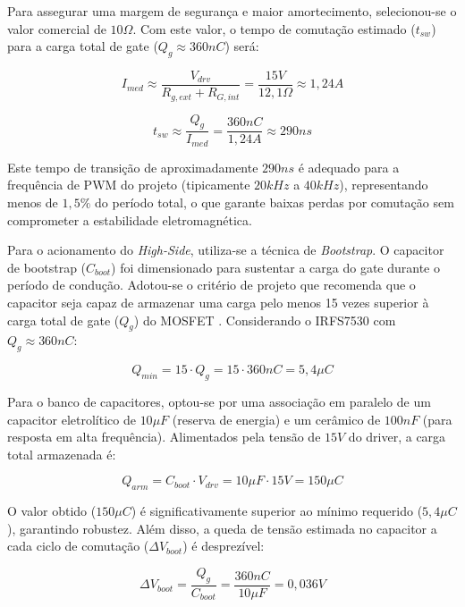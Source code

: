 \documentclass[12pt, a4paper, openright, oneside, brazilian]{abntex2}
\begin{document}
Para assegurar uma margem de segurança e maior amortecimento, selecionou-se o valor comercial de \textbf{$10 \Omega$}. Com este valor, o tempo de comutação estimado ($t_{sw}$) para a carga total de gate ($Q_g \approx 360nC$) será:

\begin{equation}
    I_{med} \approx \frac{V_{drv}}{R_{g,ext} + R_{G,int}} = \frac{15V}{12,1 \Omega} \approx 1,24 A
\end{equation}

\begin{equation}
    t_{sw} \approx \frac{Q_g}{I_{med}} = \frac{360nC}{1,24A} \approx 290 ns
\end{equation}

Este tempo de transição de aproximadamente $290ns$ é adequado para a frequência de PWM do projeto (tipicamente $20kHz$ a $40kHz$), representando menos de $1,5\%$ do período total, o que garante baixas perdas por comutação sem comprometer a estabilidade eletromagnética.

Para o acionamento do \textit{High-Side}, utiliza-se a técnica de \textit{Bootstrap}. O capacitor de bootstrap ($C_{boot}$) foi dimensionado para sustentar a carga do gate durante o período de condução. Adotou-se o critério de projeto que recomenda que o capacitor seja capaz de armazenar uma carga pelo menos 15 vezes superior à carga total de gate ($Q_g$) do MOSFET \cite{adamsDT98}. Considerando o IRFS7530 com $Q_g \approx 360nC$:

\begin{equation}
    Q_{min} = 15 \cdot Q_g = 15 \cdot 360nC = 5,4 \mu C
\end{equation}

Para o banco de capacitores, optou-se por uma associação em paralelo de um capacitor eletrolítico de $10\mu F$ (reserva de energia) e um cerâmico de $100nF$ (para resposta em alta frequência). Alimentados pela tensão de $15V$ do driver, a carga total armazenada é:

\begin{equation}
    Q_{arm} = C_{boot} \cdot V_{drv} = 10\mu F \cdot 15V = 150 \mu C
\end{equation}

O valor obtido ($150 \mu C$) é significativamente superior ao mínimo requerido ($5,4 \mu C$), garantindo robustez. Além disso, a queda de tensão estimada no capacitor a cada ciclo de comutação ($\Delta V_{boot}$) é desprezível:

\begin{equation}
    \Delta V_{boot} = \frac{Q_g}{C_{boot}} = \frac{360nC}{10\mu F} = 0,036V
\end{equation}
\end{document}
